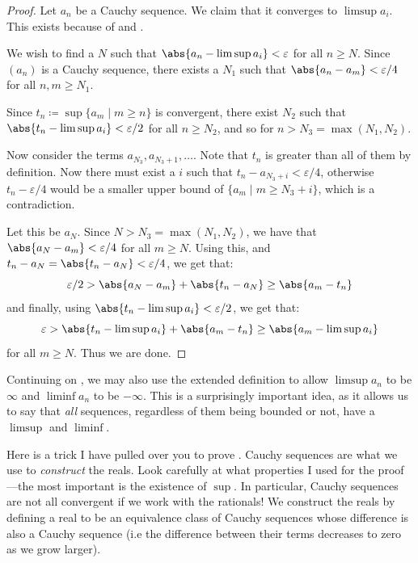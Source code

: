 \begin{proof}
Let $a_n$ be a Cauchy sequence. We claim that it converges to $\limsup a_i$. This exists because
of  and .

We wish to find a $N$ such that $\abs{a_n - \limsup a_i} < \varepsilon$ for all $n \ge N$.
Since $(a_n)$ is a Cauchy sequence, there exists a $N_1$ such that $\abs{a_n - a_m} < \varepsilon/4$ for all $n, m \ge N_1$.

Since $t_n \coloneq \sup \{a_m \mid m \ge n\}$ is convergent, there exist $N_2$
such that $\abs{t_n - \limsup a_i} < \varepsilon/2$ for all $n \ge N_2$, and so for $n > N_3 = \max(N_1, N_2)$.

Now consider the terms $a_{N_3}, a_{N_3+1}, \dots$. Note that $t_n $ is greater than all of them
by definition. Now there must exist a $i$ such that $t_n - a_{N_3 + i} < \varepsilon/4$, otherwise
$t_n - \varepsilon/4$ would be a smaller upper bound of $\{a_m \mid m \ge N_3 + i\}$, which is a contradiction.

Let this be $a_{N}$. Since $N > N_3 = \max(N_1, N_2)$, we have that $\abs{a_N - a_m} < \varepsilon/4$ for all $m \ge N$.
Using this, and $t_n - a_{N} = \abs{t_n - a_{N}} < \varepsilon/4$, we get that:
\[
\varepsilon/2 > \abs{a_{N} - a_m} + \abs{t_n - a_{N}} \ge \abs{a_m - t_n}
\]
and finally, using $\abs{t_n - \limsup a_i} < \varepsilon/2$, we get that:
\[
\varepsilon > \abs{t_n - \limsup a_i} + \abs{a_m - t_n} \ge \abs{a_m - \limsup a_i}
\]
for all $m \ge N$. Thus we are done.
\end{proof}

\vspace{-1em}
\begin{remark}
    Continuing on , we may also
    use the extended definition to allow $\limsup a_n$ to be $\infty$ and
    $\liminf a_n$ to be $-\infty$. This is a surprisingly important idea,
    as it allows us to say that \emph{all} sequences, regardless of them being bounded or not,
    have a $\limsup$ and $\liminf$.
\end{remark}
\vspace{-1em}
\begin{remark}
    Here is a trick I have pulled over you to prove . Cauchy
    sequences are what we use to \emph{construct} the reals. Look carefully at what properties
    I used for the proof---the most important is the existence of $\sup$. In particular,
    Cauchy sequences are not all convergent if we work with the rationals! We construct
    the reals by defining a real to be an equivalence class of Cauchy sequences whose
    difference is also a Cauchy sequence (i.e the difference between their terms decreases to zero as
    we grow larger).
\end{remark}

